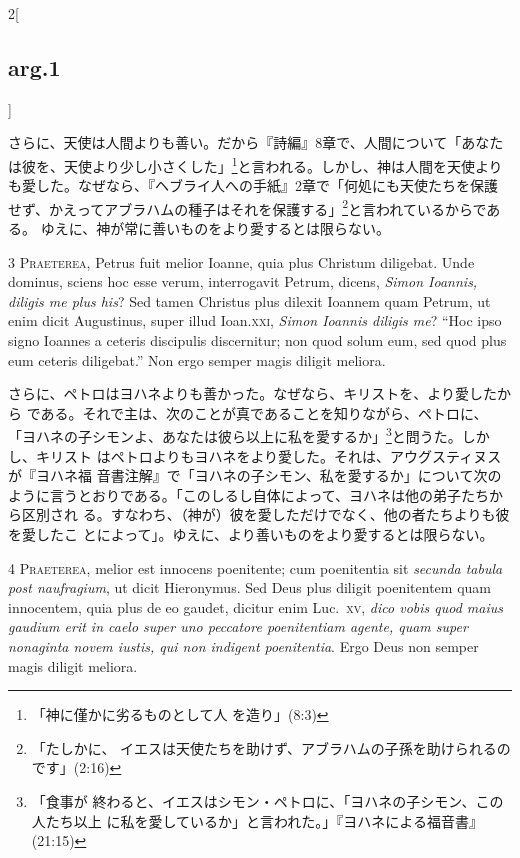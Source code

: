 \documentclass[paper=a4paper,fontsize=10pt,jafontsize=9pt,titlepage]{jlreq}
\begin{document}
\begin{paracol}{2}[\subsection{arg.1}]
\switchcolumn

さらに、天使は人間よりも善い。だから『詩編』8章で、人間について「あなた
 は彼を、天使より少し小さくした」\footnote{「神に僅かに劣るものとして人
 を造り」(8:3)}と言われる。しかし、神は人間を天使より
 も愛した。なぜなら、『ヘブライ人への手紙』2章で「何処にも天使たちを保護
 せず、かえってアブラハムの種子はそれを保護する」\footnote{「たしかに、
 イエスは天使たちを助けず、アブラハムの子孫を助けられるのです」(2:16)}と言われているからである。
 ゆえに、神が常に善いものをより愛するとは限らない。



{\scshape 3 Praeterea}, Petrus fuit melior Ioanne, quia plus Christum
 diligebat. Unde dominus, sciens hoc esse verum, interrogavit Petrum,
 dicens, {\itshape Simon Ioannis, diligis me plus his}? Sed tamen Christus plus
 dilexit Ioannem quam Petrum, ut enim dicit Augustinus, super illud
 Ioan.{\scshape xxi}, {\itshape Simon Ioannis diligis me}? ``Hoc ipso signo Ioannes a ceteris
 discipulis discernitur; non quod solum eum, sed quod plus eum ceteris
 diligebat.'' Non ergo semper magis diligit meliora.

\switchcolumn

さらに、ペトロはヨハネよりも善かった。なぜなら、キリストを、より愛したから
 である。それで主は、次のことが真であることを知りながら、ペトロに、
 「ヨハネの子シモンよ、あなたは彼ら以上に私を愛するか」\footnote{「食事が
 終わると、イエスはシモン・ペトロに、「ヨハネの子シモン、この人たち以上
 に私を愛しているか」と言われた。」『ヨハネによる福音書』(21:15)}と問うた。しかし、キリスト
 はペトロよりもヨハネをより愛した。それは、アウグスティヌスが『ヨハネ福
 音書注解』で「ヨハネの子シモン、私を愛するか」について次のように言うとおりである。「このしるし自体によって、ヨハネは他の弟子たちから区別され
る。すなわち、（神が）彼を愛しただけでなく、他の者たちよりも彼を愛したこ
 とによって」。ゆえに、より善いものをより愛するとは限らない。



{\scshape 4 Praeterea}, melior est innocens poenitente; cum poenitentia
 sit {\itshape secunda tabula post naufragium}, ut dicit Hieronymus. Sed Deus plus
 diligit poenitentem quam innocentem, quia plus de eo gaudet, dicitur
 enim Luc.~{\scshape xv}, {\itshape dico vobis quod maius gaudium erit in caelo super uno
 peccatore poenitentiam agente, quam super nonaginta novem iustis, qui
 non indigent poenitentia}. Ergo Deus non semper magis diligit meliora.


\end{paracol}
\end{document}
